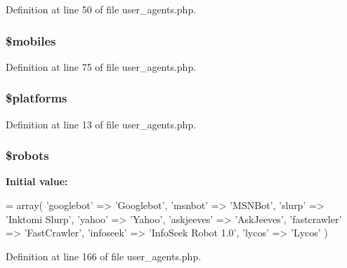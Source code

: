 Definition at line 50 of file user\-\_\-agents.\-php.

\hypertarget{user__agents_8php_a6928dde5aa0be443766d5b2376de908a}{
\subsubsection[{\$mobiles}]{\setlength{\rightskip}{0pt plus 5cm}\$mobiles}}\label{user__agents_8php_a6928dde5aa0be443766d5b2376de908a}


Definition at line 75 of file user\-\_\-agents.\-php.

\hypertarget{user__agents_8php_a1c1a0a860242698ee6b3f4ef7d6eb343}{
\subsubsection[{\$platforms}]{\setlength{\rightskip}{0pt plus 5cm}\$platforms}}\label{user__agents_8php_a1c1a0a860242698ee6b3f4ef7d6eb343}


Definition at line 13 of file user\-\_\-agents.\-php.

\hypertarget{user__agents_8php_a5752e2a66d1c03bc34666492746037ab}{
\subsubsection[{\$robots}]{\setlength{\rightskip}{0pt plus 5cm}\$robots}}\label{user__agents_8php_a5752e2a66d1c03bc34666492746037ab}
{\bfseries Initial value\-:}
\begin{DoxyCode}
= array(
                    \textcolor{stringliteral}{'googlebot'}         => \textcolor{stringliteral}{'Googlebot'},
                    \textcolor{stringliteral}{'msnbot'}            => \textcolor{stringliteral}{'MSNBot'},
                    \textcolor{stringliteral}{'slurp'}             => \textcolor{stringliteral}{'Inktomi Slurp'},
                    \textcolor{stringliteral}{'yahoo'}             => \textcolor{stringliteral}{'Yahoo'},
                    \textcolor{stringliteral}{'askjeeves'}         => \textcolor{stringliteral}{'AskJeeves'},
                    \textcolor{stringliteral}{'fastcrawler'}       => \textcolor{stringliteral}{'FastCrawler'},
                    \textcolor{stringliteral}{'infoseek'}          => \textcolor{stringliteral}{'InfoSeek Robot 1.0'},
                    \textcolor{stringliteral}{'lycos'}             => \textcolor{stringliteral}{'Lycos'}
                )
\end{DoxyCode}


Definition at line 166 of file user\-\_\-agents.\-php.

